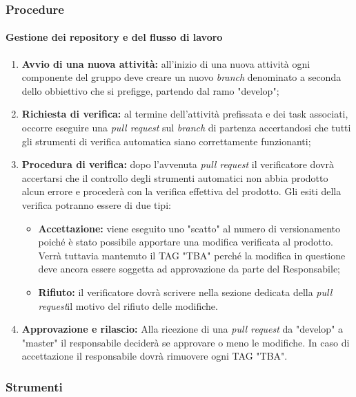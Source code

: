 \subsubsection{Procedure}
\paragraph{Gestione dei repository e del flusso di lavoro}

	\begin{enumerate}
		\item \textbf{Avvio di una nuova attività: } all’inizio di una nuova attività ogni componente del gruppo
		deve creare un nuovo \textit{branch\glos} denominato a seconda dello obbiettivo che si prefigge, partendo dal ramo "develop";
		\item \textbf{Richiesta di verifica: } al termine dell'attività prefissata e dei task associati, occorre eseguire una \textit{pull request\glo} sul \textit{branch\glo} di partenza accertandosi che tutti gli strumenti di verifica automatica siano correttamente funzionanti;
		\item \textbf{Procedura di verifica:} dopo l'avvenuta \textit{pull request\glo} il verificatore dovrà accertarsi che il controllo degli strumenti automatici non abbia prodotto alcun errore e procederà con la verifica effettiva del prodotto. Gli esiti della verifica potranno essere di due tipi:
		\begin{itemize}
			\item \textbf{Accettazione:} viene eseguito uno "scatto" al numero di versionamento poiché è stato possibile apportare una modifica verificata al prodotto. Verrà tuttavia mantenuto il TAG "TBA" perché la modifica in questione deve ancora essere soggetta ad approvazione da parte del Responsabile;
			\item \textbf{Rifiuto:} il verificatore dovrà scrivere nella sezione dedicata della
			\textit{pull request}\glo il motivo del rifiuto delle modifiche.
		\end{itemize}
		\item \textbf{Approvazione e rilascio:} Alla ricezione di una \textit{pull request\glo} da "develop" a "master" il responsabile deciderà se approvare o meno le modifiche. In caso di accettazione il responsabile dovrà rimuovere ogni TAG "TBA".
	\end{enumerate}


\subsubsection{Strumenti}

